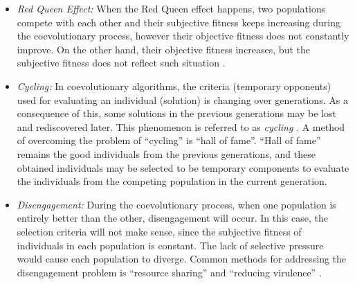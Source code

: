 \begin{itemize}

\item \textit{Red Queen Effect:} When the Red Queen effect happens, two populations compete with each other and their subjective fitness keeps increasing during the coevolutionary process, however their objective fitness does not constantly improve. On the other hand, their objective fitness increases, but the subjective fitness does not reflect such situation \cite{Bongard2005}. 

\item \textit{Cycling:} In coevolutionary algorithms, the criteria (temporary opponents) used for evaluating an individual (solution) is changing over generations. As a consequence of this, some solutions in the previous generations may be lost and rediscovered later. This phenomenon is referred to as \textit{cycling} \cite{John_2004}. A method of overcoming the problem of ``cycling'' is ``hall of fame''\cite{Rosin_1997}. ``Hall of fame'' remains the good individuals from the previous generations, and these obtained individuals may be selected to be temporary components to evaluate the individuals from the competing population in the current generation.

\item \textit{Disengagement:} During the coevolutionary process, when one population is entirely better than the other, disengagement will occur. In this case, the selection criteria will not make sense, since the subjective fitness of individuals in each population is constant. The lack of selective pressure would cause each population to diverge. Common methods for addressing the disengagement problem is ``resource sharing'' \cite{Juille98coevolvingthe} and ``reducing virulence'' \cite{John_2004}. 


\end{itemize}

